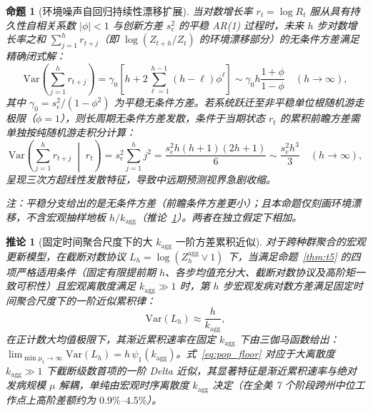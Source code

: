 \documentclass[11pt,a4paper]{article}
\theoremstyle{plain}
\newtheorem{proposition}{命题}
\newtheorem{corollary}{推论}
\theoremstyle{definition}
\begin{document}
\begin{proposition}[环境噪声自回归持续性漂移扩展]\label{prop:t5r}
当对数增长率 $r_t = \log R_t$ 服从具有持久性自相关系数 $|\phi| < 1$ 与创新方差 $s_e^2$ 的平稳 AR(1) 过程时，未来 $h$ 步对数增长率之和 $\sum_{j=1}^h r_{t+j}$（即 $\log(Z_{t+h}/Z_t)$ 的环境漂移部分）的无条件方差满足精确闭式解：
\begin{equation}
\text{Var}\left(\sum_{j=1}^h r_{t+j}\right) = \gamma_0 \left[ h + 2 \sum_{\ell=1}^{h-1} (h-\ell) \phi^\ell \right] \sim \gamma_0 h \frac{1+\phi}{1-\phi} \quad (h \to \infty), \label{eq:ar1_sum}
\end{equation}
其中 $\gamma_0 = s_e^2/(1-\phi^2)$ 为平稳无条件方差。若系统跃迁至非平稳单位根随机游走极限（$\phi = 1$），则长周期无条件方差发散，条件于当期状态 $r_t$ 的累积前瞻方差需单独按纯随机游走积分计算：
\begin{equation}
\text{Var}\left(\sum_{j=1}^h r_{t+j} \;\middle|\; r_t\right) = s_e^2 \sum_{j=1}^h j^2 = \frac{s_e^2 h(h+1)(2h+1)}{6} \sim \frac{s_e^2 h^3}{3} \quad (h \to \infty),
\end{equation}
呈现三次方超线性发散特征，导致中远期预测视界急剧收缩。

注：平稳分支给出的是无条件方差（前瞻条件方差更小）；且本命题仅刻画环境漂移，不含宏观抽样地板 $h/k_{\text{agg}}$（推论~\ref{cor:pop_floor}）。两者在独立假定下相加。
\end{proposition}


\begin{corollary}[固定时间聚合尺度下的大 $k_{\text{agg}}$ 一阶方差累积近似]\label{cor:pop_floor}
对于跨种群聚合的宏观更新模型，在截断对数协议 $L_h = \log(Z_h^{\text{agg}} \vee 1)$ 下，当满足命题~\ref{thm:t5} 的四项严格适用条件（固定有限提前期 $h$、各步均值充分大、截断对数协议及高阶矩一致可积性）且宏观离散度满足 $k_{\text{agg}} \gg 1$ 时，第 $h$ 步宏观发病对数方差满足固定时间聚合尺度下的一阶近似累积律：
\begin{equation}
\text{Var}(L_h) \approx \frac{h}{k_{\text{agg}}},
\label{eq:pop_floor}
\end{equation}
在正计数大均值极限下，其渐近累积速率在固定 $k_{\text{agg}}$ 下由三伽马函数给出：$\lim_{\min \mu_t \to \infty} \text{Var}(L_h) = h\,\psi_1(k_{\text{agg}})$。式~\eqref{eq:pop_floor} 对应于大离散度 $k_{\text{agg}} \gg 1$ 下截断级数首项的一阶 Delta 近似，其显著特征是渐近累积速率与绝对发病规模 $\mu$ 解耦，单纯由宏观时序离散度 $k_{\text{agg}}$ 决定（在全美 7 个阶段跨州中位工作点上高阶差额约为 $0.9\%$--$4.5\%$）。
\end{corollary}
\end{document}
